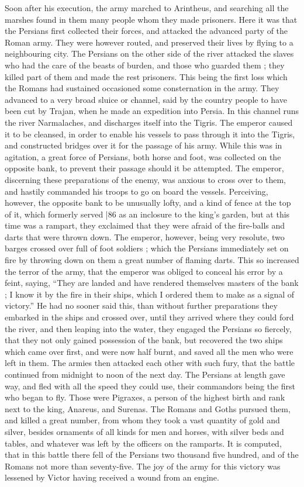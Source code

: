 Soon after his execution, the army marched to Arintheus, and searching all the marshes found in them many people whom they made prisoners. Here it was that the Persians first collected their forces, and attacked the advanced party of the Roman army. They were however routed, and preserved their lives by flying to a neighbouring city. The Persians on the other side of the river attacked the slaves who had the care of the beasts of burden, and those who guarded them ; they killed part of them and made the rest prisoners. This being the first loss which the Romans had sustained occasioned some consternation in the army. They advanced to a very broad sluice or channel, said by the country people to have been cut by Trajan, when he made an expedition into Persia. In this channel runs the river Narmalaches, and discharges itself into the Tigris. The emperor caused it to be cleansed, in order to enable his vessels to pass through it into the Tigris, and constructed bridges over it for the passage of his army. While this was in agitation, a great force of Persians, both horse and foot, was collected on the opposite bank, to prevent their passage should it be attempted. The emperor, discerning these preparations of the enemy, was anxious to cross over to them, and hastily commanded his troops to go on board the vessels. Perceiving, however, the opposite bank to be unusually lofty, and a kind of fence at the top of it, which formerly served
|86 as an inclosure to the king's garden, but at this time was a rampart, they exclaimed that they were afraid of the fire-balls and darts that were thrown down. The emperor, however, being very resolute, two barges crossed over full of foot soldiers ; which the Persians immediately set on fire by throwing down on them a great number of flaming darts. This so increased the terror of the army, that the emperor was obliged to conceal his error by a feint, saying, ``They are landed and have rendered themselves masters of the bank ; I know it by the fire in their ships, which I ordered them to make as a signal of victory.'' He had no sooner said this, than without further preparations they embarked in the ships and crossed over, until they arrived where they could ford the river, and then leaping into the water, they engaged the Persians so fiercely, that they not only gained possession of the bank, but recovered the two ships which came over first, and were now half burnt, and saved all the men who were left in them. The armies then attacked each other with such fury, that the battle continued from midnight to noon of the next day. The Persians at length gave way, and fled with all the speed they could use, their commandors being the first who began to fly. Those were Pigraxes, a person of the highest birth and rank next to the king, Anareus, and Surenas. The Romans and Goths pursued them, and killed a great number, from whom they took a vast quantity of gold and silver, besides ornaments of all kinds for men and horses, with silver beds and tables, and whatever was left by the officers on the ramparts. It is computed, that in this battle there fell of the Persians two thousand five hundred, and of the Romans not more than seventy-five. The joy of the army for this victory was lessened by Victor having received a wound from an engine.

